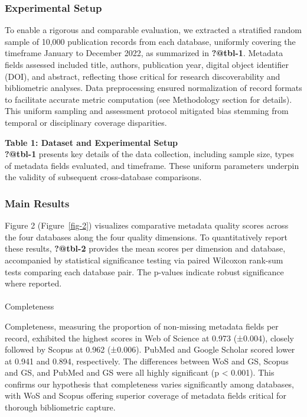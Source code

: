 \documentclass[
  12pt,
]{article}
\makeatletter
\let\oldparagraph\paragraph
\renewcommand{\paragraph}{
    \@ifstar
      \xxxParagraphStar
      \xxxParagraphNoStar
  }
\newcommand{\xxxParagraphStar}[1]{\oldparagraph*{#1}\mbox{}}
\newcommand{\xxxParagraphNoStar}[1]{\oldparagraph{#1}\mbox{}}
\makeatother
\begin{document}
\subsubsection{Experimental Setup}\label{experimental-setup}

To enable a rigorous and comparable evaluation, we extracted a
stratified random sample of 10,000 publication records from each
database, uniformly covering the timeframe January to December 2022, as
summarized in \textbf{?@tbl-1}. Metadata fields assessed included title,
authors, publication year, digital object identifier (DOI), and
abstract, reflecting those critical for research discoverability and
bibliometric analyses. Data preprocessing ensured normalization of
record formats to facilitate accurate metric computation (see
Methodology section for details). This uniform sampling and assessment
protocol mitigated bias stemming from temporal or disciplinary coverage
disparities.

\textbf{Table 1: Dataset and Experimental Setup}\\
\textbf{?@tbl-1} presents key details of the data collection, including
sample size, types of metadata fields evaluated, and timeframe. These
uniform parameters underpin the validity of subsequent cross-database
comparisons.

\subsubsection{Main Results}\label{main-results}

Figure 2 (Figure~\ref{fig-2}) visualizes comparative metadata quality
scores across the four databases along the four quality dimensions. To
quantitatively report these results, \textbf{?@tbl-2} provides the mean
scores per dimension and database, accompanied by statistical
significance testing via paired Wilcoxon rank-sum tests comparing each
database pair. The p-values indicate robust significance where reported.

\paragraph{Completeness}\label{completeness-1}

Completeness, measuring the proportion of non-missing metadata fields
per record, exhibited the highest scores in Web of Science at 0.973
(±0.004), closely followed by Scopus at 0.962 (±0.006). PubMed and
Google Scholar scored lower at 0.941 and 0.894, respectively. The
differences between WoS and GS, Scopus and GS, and PubMed and GS were
all highly significant (p \textless{} 0.001). This confirms our
hypothesis that completeness varies significantly among databases, with
WoS and Scopus offering superior coverage of metadata fields critical
for thorough bibliometric capture.
\end{document}
